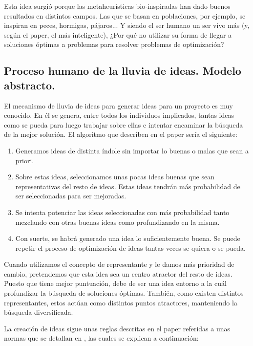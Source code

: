 Esta idea surgió porque las metaheurísticas bio-inspiradas han dado buenos resultados en distintos campos. Las que se basan en poblaciones, por ejemplo, se inspiran en peces, hormigas, pájaros... Y siendo el ser humano un ser vivo más (y, según el paper, el más inteligente), ¿Por qué no utilizar su forma de llegar a soluciones óptimas a problemas para resolver problemas de optimización?\\

\subsection{Proceso humano de la lluvia de ideas. Modelo abstracto.}

El mecanismo de lluvia de ideas para generar ideas para un proyecto es muy conocido. En él se genera, entre todos los individuos implicados, tantas ideas como se pueda para luego trabajar sobre ellas e intentar encaminar la búsqueda de la mejor solución. El algoritmo que describen en el paper sería el siguiente:\\

\begin{enumerate}
	\item Generamos ideas de distinta índole sin importar lo buenas o malas que sean a priori.
	\item Sobre estas ideas, seleccionamos unas pocas ideas buenas que sean representativas del resto de ideas. Estas ideas tendrán más probabilidad de ser seleccionadas para ser mejoradas.
	\item Se intenta potenciar las ideas seleccionadas con más probabilidad tanto mezclando con otras buenas ideas como profundizando en la misma.
	\item Con suerte, se habrá generado una idea lo suficientemente buena. Se puede repetir el proceso de optimización de ideas tantas veces se quiera o se pueda.
\end{enumerate}

Cuando utilizamos el concepto de representante y le damos más prioridad de cambio, pretendemos que esta idea sea un centro atractor del resto de ideas. Puesto que tiene mejor puntuación, debe de ser una idea entorno a la cuál profundizar la búsqueda de soluciones óptimas. También, como existen distintos representantes, estos actúan como distintos puntos atractores, manteniendo la búsqueda diversificada.


La creación de ideas sigue unas reglas descritas en el paper referidas a unas normas que se detallan en \cite{smith}, las cuales se explican a continuación:

